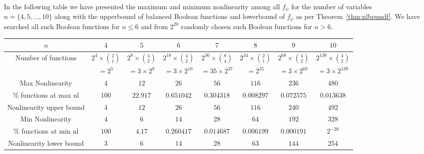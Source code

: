 \documentclass{llncs}
\begin{document}
In the following table we have presented the maximum and minimum nonlinearity among all $f_\psi$ for the number of variables $n = \{4, 5, \ldots, 10\}$ along with the upperbound of balanced Boolean functions and lowerbound of $f_{\psi}$ as per Theorem~\ref{thm:nlboundf}. We have searched all such Boolean functions for $n \leq 6$ and from $2^{20}$ randomly chosen such Boolean functions for $n > 6$.
\begin{center}
\begin{tabular}{|c|c|c|c||c|c|c|c|}\hline
$n$ & $4$ & $5$ & $6$ & $7$ & $8$ & $9$ & $10$\\ \hline
Number of functions & $2^4 \times \binom{2}{1}$ & $2^8 \times \binom{4}{2}$ & $2^{18} \times \binom{4}{2}$&$2^{36} \times \binom{8}{4}$&$2^{34} \times \binom{2}{1}$& $2^{68} \times \binom{4}{2}$& $2^{138} \times \binom{4}{2}$\\
& $ = 2^5$& $= 3\times 2^9$& $= 3\times 2^{19}$& $= 35\times 2^{37}$&$ = 2^{35}$&$= 3\times 2^{69}$& $= 3\times 2^{139}$\\ \hline
Max Nonlinearity & $4$ & $12$ & $26$ & $56$ & $116$ & $236$ & $480$\\ \hline
\% functions at max nl & $100$ & $22.917$ & $0.651042$ & $0.304318$ & $0.008297$ & $0.072575$ & $0.013638$\\ \hline
Nonlinearity upper bound & $4$ & $12$ & $26$ & $56$ & $116$ & $240$ & $492$\\ \hline
Min Nonlinearity & $4$ & $6$ & $14$ & $28$ & $64$ & $192$ & $328$\\ \hline
\% functions at min nl & $100$ & $4.17$ & $0.260417$ & $0.014687$ & $0.006199$ & $0.000191$ & $2^{-20}$\\ \hline
Nonlinearity lower bound & $3$ & $6$ & $14$ & $28$ & $63$ & $144$ & $254$\\ \hline
\end{tabular}
\end{center}
\end{document}
